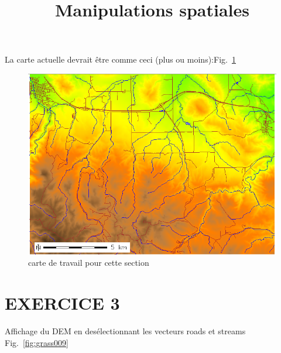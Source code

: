 %

\graphicspath{{./images/}}

\title{Manipulations spatiales}
\subtitle{}
\author{}

\maketitle

La carte actuelle devrait \^etre comme ceci (plus ou moins):Fig.~\ref{fig:grass008}

\begin{figure}[htbp]
   \centering
   \includegraphics[scale=0.35]{grass008.png}
   \caption{carte de travail pour cette section}
   \label{fig:grass008}
\end{figure}

\section{EXERCICE 3}
Affichage du DEM en des\'electionnant les vecteurs roads et streams Fig.~\ref{fig:grass009}

